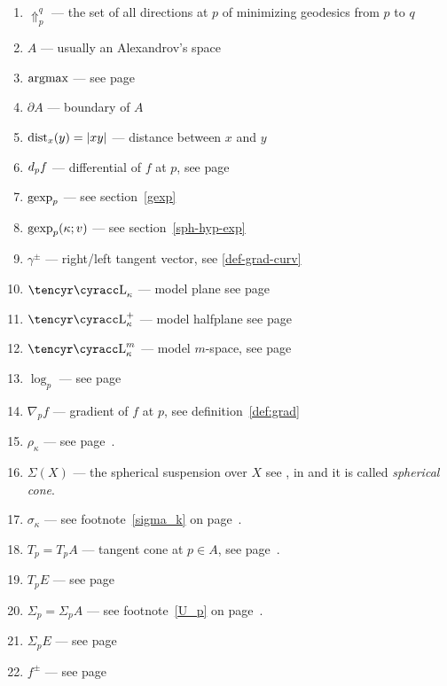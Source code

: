 \documentclass{article}
\begin{document}
\begin{enumerate}[$\diamond$]
\item $\Uparrow_p^q$ --- the set of all directions at $p$ of minimizing geodesics from $p$ to $q$ 

\item $A$ --- usually an Alexandrov's space

\item $\operatorname{argmax}$ --- see page~\pageref{argmax}

\item $\partial A$ --- boundary of $A$

\item $\operatorname{dist}_x(y)=|x y|$  --- distance between $x$ and $y$

\item $d_p f$ --- differential of $f$ at $p$, see page~\pageref{def:df}

\item $\operatorname{gexp}_p$ --- see section~\ref{gexp} 

\item $\operatorname{gexp}_p(\kappa;v)$ --- see section~\ref{sph-hyp-exp}

\item $\gamma^\pm$ --- right/left tangent vector, see \ref{def-grad-curv}

\item $\Lob_\kappa$ --- model plane see page~\pageref{Lob_k}

\item $\Lob_\kappa^+$ --- model halfplane see page~\pageref{Lob_k^+}

\item $\Lob_\kappa^m$ --- model $m$-space, see page~\pageref{lob-k-m}

\item $\log_p$ --- see page~\pageref{log}

\item $\nabla_p f$ --- gradient of $f$ at $p$, see definition~\ref{def:grad}

\item $\rho_\kappa$ --- see page~\pageref{rho_k}.

\item $\Sigma(X)$ --- the spherical suspension over $X$ see \cite[4.3.1]{BGP}, in \cite[89]{plaut:survey} and \cite{berestovskii} it is called \emph{spherical cone}.

\item $\sigma_\kappa$ --- see footnote~\ref{sigma_k} on page~\pageref{sigma_k}.

\item $T_p=T_p A$ --- tangent cone at $p\in A$, see page~\pageref{T_p}.

\item $T_p E$ --- see page~\pageref{T_pE}

\item $\Sigma_p=\Sigma_p A$ --- see footnote~\ref{U_p} on page~\pageref{U_p}.

\item $\Sigma_p E$ --- see page~\pageref{U_pX}

\item $f^\pm$ --- see page~\pageref{def-grad-curv}

\end{enumerate}
\end{document}
